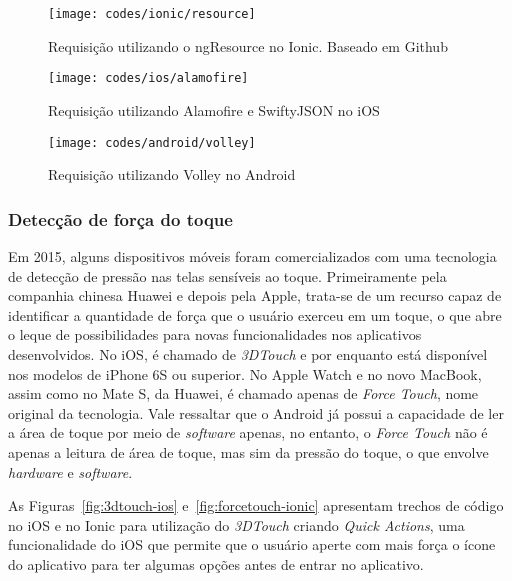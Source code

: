 \begin{figure}[H]
	\centering
	\texttt{[image: codes/ionic/resource]}
	\caption[Requisição utilizando o ngResource no Ionic]{Requisição utilizando o ngResource no Ionic. Baseado em Github\protect\footnotemark}
	\label{fig:resource-ionic}
\end{figure}
\begin{figure}[H]
	\centering
	\texttt{[image: codes/ios/alamofire]}
	\caption[Requisição utilizando Alamofire e SwiftyJSON no iOS]{Requisição utilizando Alamofire e SwiftyJSON no iOS}
	\label{fig:alamofire-ios}
\end{figure} 
\begin{figure}[H]
	\centering
	\texttt{[image: codes/android/volley]}
	\caption[Requisição utilizando Volley no Android]{Requisição utilizando Volley no Android}
	\label{fig:volley-android}
\end{figure}


\subsubsection{Detecção de força do toque} \label{subsubsec:forcetouch}
Em 2015, alguns dispositivos móveis foram comercializados com uma tecnologia de detecção de pressão nas telas sensíveis ao toque. Primeiramente pela companhia chinesa Huawei e depois pela Apple, trata-se de um recurso 
capaz de identificar a quantidade de força que o usuário exerceu em um toque, o que abre o leque de possibilidades para novas funcionalidades nos aplicativos desenvolvidos. 
No iOS, é chamado de \textit{3DTouch} e por enquanto está disponível nos modelos de iPhone 6S ou superior. No Apple Watch e no novo MacBook, assim como no Mate S, da Huawei, é chamado apenas de \textit{Force Touch}, 
nome original da tecnologia. 
Vale ressaltar que o Android já possui a capacidade de ler a área de toque por meio de \textit{software} apenas, no entanto, o \textit{Force Touch} não é apenas a leitura de área de toque, mas sim da pressão do toque,
o que envolve \textit{hardware} e \textit{software}.

As Figuras~\ref{fig:3dtouch-ios} e~\ref{fig:forcetouch-ionic} apresentam trechos de código no iOS e no Ionic para utilização do \textit{3DTouch} criando \textit{Quick Actions}, uma funcionalidade do iOS que permite 
que o usuário aperte com mais força o ícone do aplicativo para ter algumas opções antes de entrar no aplicativo.

